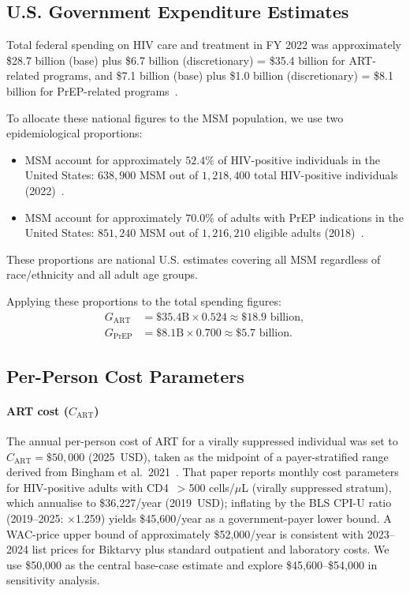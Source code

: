 \documentclass[preprint,12pt]{elsarticle}
\begin{document}
{%
\subsection{U.S. Government Expenditure Estimates}

Total federal spending on HIV care and treatment in FY 2022 was approximately \$28.7 billion (base) plus \$6.7 billion (discretionary) = \$35.4 billion for
ART-related programs, and \$7.1 billion (base) plus \$1.0 billion (discretionary) = \$8.1 billion for PrEP-related programs~\cite{KFF2023}.

To allocate these national figures to the MSM population, we use two epidemiological proportions:
\begin{itemize}
    \item MSM account for approximately $52.4\%$ of HIV-positive individuals in the
          United States: $638{,}900$ MSM out of $1{,}218{,}400$ total
          HIV-positive individuals (2022)~\cite{Fed_HIV_stats}.
    \item MSM account for approximately $70.0\%$ of adults with PrEP indications
          in the United States: $851{,}240$ MSM out of $1{,}216{,}210$ eligible
          adults (2018)~\cite{prepcosts2018}.
\end{itemize}

These proportions are national U.S. estimates covering all MSM regardless of
race/ethnicity and all adult age groups.

Applying these proportions to the total spending figures:
\begin{align}
G_{\text{ART}}  &= \$35.4\text{B} \times 0.524 \approx \$18.9\text{ billion}, \\
G_{\text{PrEP}} &= \$8.1\text{B} \times 0.700 \approx \$5.7\text{ billion}.
\end{align}

\subsection{Per-Person Cost Parameters}

\paragraph{ART cost ($C_{\text{ART}}$)}
The annual per-person cost of ART for a virally suppressed individual was set to
$C_{\text{ART}} = \$50{,}000$ (2025~USD), taken as the midpoint of a payer-stratified
range derived from Bingham et al.\ 2021~\cite{BinghamFarnham2021}.
That paper reports monthly cost parameters for HIV-positive adults with CD4~$>$500
cells/$\mu$L (virally suppressed stratum), which annualise to \$36{,}227/year
(2019~USD); inflating by the BLS CPI-U ratio (2019--2025: $\times$1.259) yields
\$45{,}600/year as a government-payer lower bound. A WAC-price upper bound of
approximately \$52{,}000/year is consistent with 2023--2024 list prices for
Biktarvy plus standard outpatient and laboratory costs. We use \$50{,}000 as the
central base-case estimate and explore \$45{,}600--\$54{,}000 in sensitivity analysis.

}
\end{document}
